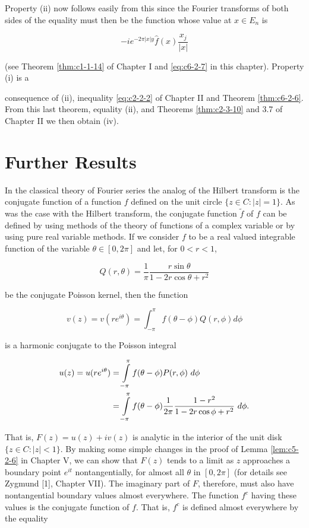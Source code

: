 Property (ii) now follows easily from this since the Fourier transforms of both sides of the equality must then be the function whose value at $x \in E_n$ is

\[
- i e^{-2\pi|x|y}\hat{f}(x) \frac{x_{j}}{|x|}
\]

(see Theorem \ref{thm:c1-1-14} of Chapter I and \eqref{eq:c6-2-7} in this chapter). Property (i) is a

consequence of (ii), inequality \eqref{eq:c2-2-2} of Chapter II and Theorem \ref{thm:c6-2-6}. From this last theorem, equality (ii), and Theorems \ref{thm:c2-3-10} and 3.7 of Chapter II we then obtain (iv).

\section{Further Results}

 In the classical theory of Fourier series the analog of the Hilbert transform is the conjugate function of a function $f$ defined on the unit circle $\{z \in C: |z| = 1\}$. As was the case with the Hilbert transform, the conjugate function $\tilde{f}$ of $f$ can be defined by using methods of the theory of functions of a complex variable or by using pure real variable methods. If we consider $f$ to be a real valued integrable function of the variable $\theta \in [0, 2\pi]$ and let, for $0 < r < 1$,

\[
Q(r,\theta)=\frac{1}{\pi}\frac{r\sin\theta}{1-2r\cos\theta+r^{2}}
\]

be the conjugate Poisson kernel, then the function

\[
v(z)=v(r e^{i\theta})=\int_{-\pi}^{\pi}f(\theta-\phi)Q(r,\phi)d\phi
\]

is a harmonic conjugate to the Poisson integral

\[
\begin{aligned}{u(z)=u(r e^{i\theta})}&{{}=\intop_{-\pi}^{\pi}f(\theta-\phi)P(r,\phi)\mathop{}{d}\phi}\\ {}&{{}=\intop_{-\pi}^{\pi}f(\theta-\phi)\frac{1}{2\pi}\frac{1-r^{2}}{1-2r\cos\phi+r^{2}}\mathop{}{d}\phi.}\\ \end{aligned}
\]

That is, $F(z) = u(z) + iv(z)$ is analytic in the interior of the unit disk $\{z \in C: |z| < 1\}$. By making some simple changes in the proof of Lemma \ref{lem:c5-2-6} in Chapter V, we can show that $F(z)$ tends to a limit as $z$ approaches a boundary point $e^{it}$ nontangentially, for almost all $\theta$ in $[0, 2\pi]$ (for details see Zygmund [1], Chapter VII). The imaginary part of $F$, therefore, must also have nontangential boundary values almost everywhere. The function $f^c$ having these values is the conjugate function of $f$. That is, $f^c$ is defined almost everywhere by the equality

